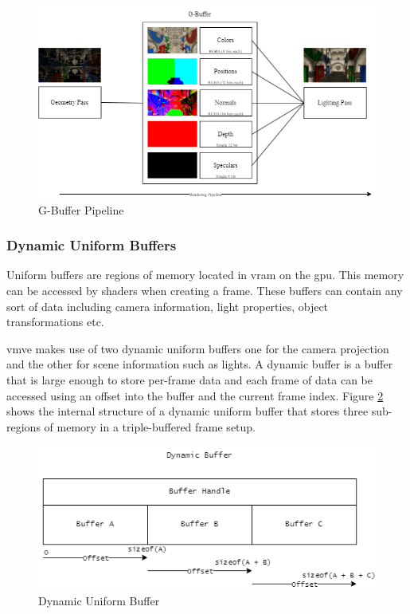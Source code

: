 \documentclass[11pt]{article}
\begin{document}
\begin{figure}[H]
  \centering
  \includegraphics[width=\textwidth]{images/g_buffer.png}
  \caption{G-Buffer Pipeline}
  \label{fig:g_buffer}
\end{figure}


\subsubsection{Dynamic Uniform Buffers}
Uniform buffers are regions of memory located in \gls*{vram} on the \gls*{gpu}.
This memory can be accessed by shaders when creating a frame. These buffers can
contain any sort of data including camera information, light properties, object
transformations etc.

\gls*{vmve} makes use of two dynamic uniform buffers one for the camera
projection and the other for scene information such as lights. A dynamic buffer
is a buffer that is large enough to store per-frame data and each frame of data
can be accessed using an offset into the buffer and the current frame index.
Figure \ref{fig:dynamic_uniform_buffer} shows the internal structure of a dynamic
uniform buffer that stores three sub-regions of memory in a triple-buffered
frame setup.

\begin{figure}[H]
  \centering
  \includegraphics[width=\textwidth]{images/dynamic_buffer.png}
  \caption{Dynamic Uniform Buffer}
  \label{fig:dynamic_uniform_buffer}
\end{figure}
\end{document}
